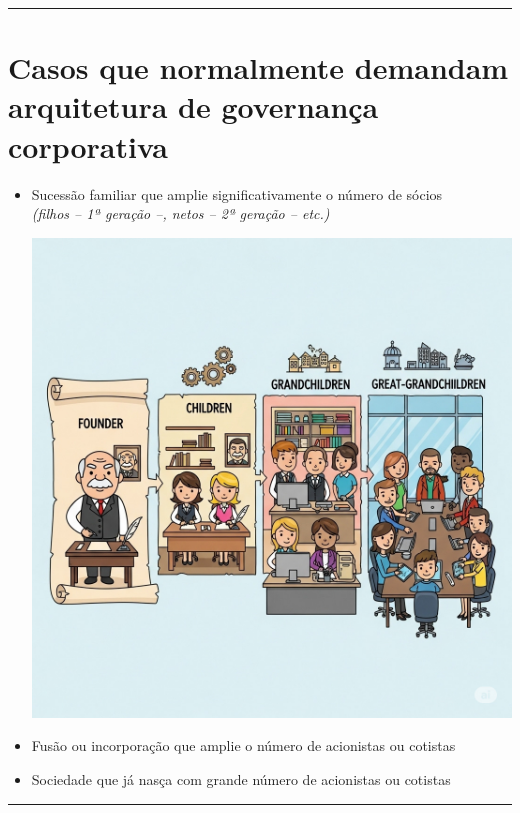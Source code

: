 \documentclass[
]{book}
\begin{document}
\begin{center}\rule{0.5\linewidth}{0.5pt}\end{center}

\section{Casos que normalmente demandam arquitetura de governança corporativa}\label{casos-que-normalmente-demandam-arquitetura-de-governanuxe7a-corporativa}

\begin{itemize}
\item
  Sucessão familiar que amplie significativamente o número de sócios\\
  \emph{(filhos -- 1ª geração --, netos -- 2ª geração -- etc.)}

  \includegraphics[width=5.69792in,height=\textheight]{images/02-2025-08-12_13/05-linha_sucessoria.jpg}
\item
  Fusão ou incorporação que amplie o número de acionistas ou cotistas
\item
  Sociedade que já nasça com grande número de acionistas ou cotistas
\end{itemize}

\begin{center}\rule{0.5\linewidth}{0.5pt}\end{center}
\end{document}
